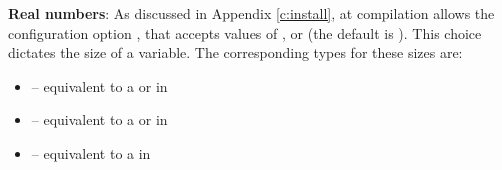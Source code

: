 \textbf{Real numbers}:  As discussed in Appendix \ref{c:install}, at compilation
{\sundials} allows the configuration option  ,
that accepts values of ,  or  (the
default is ).  This choice dictates the size of a
 variable.  The corresponding {\F} types for these
 sizes are:
\begin{itemize}
\item {} 
 -- equivalent to a  or  in {\F}

\item {} 
 -- equivalent to a  or  in {\F}

\item {} 
 -- equivalent to a  in {\F}

\end{itemize}

